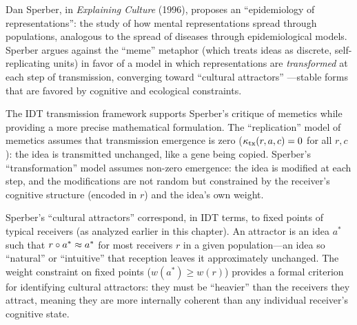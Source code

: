 \begin{interpretation}\label{interp:ch7:sperber_epidemiology}
Dan Sperber, in \emph{Explaining Culture} (1996), proposes an
``epidemiology of representations'': the study of how mental
representations spread through populations, analogous to the spread
of diseases through epidemiological models. Sperber argues against the
``meme'' metaphor (which treats ideas as discrete, self-replicating
units) in favor of a model in which representations are \emph{transformed}
at each step of transmission, converging toward ``cultural attractors''
---stable forms that are favored by cognitive and ecological constraints.

The IDT transmission framework supports Sperber's critique of memetics
while providing a more precise mathematical formulation. The
``replication'' model of memetics assumes that transmission emergence
is zero ($\kappa_{\text{tx}}(r, a, c) = 0$ for all $r, c$): the idea
is transmitted unchanged, like a gene being copied. Sperber's
``transformation'' model assumes non-zero emergence: the idea is
modified at each step, and the modifications are not random but
constrained by the receiver's cognitive structure (encoded in $r$)
and the idea's own weight.

Sperber's ``cultural attractors'' correspond, in IDT terms, to fixed
points of typical receivers (as analyzed earlier in this chapter). An
attractor is an idea $a^*$ such that $r \circ a^* \approx a^*$ for
most receivers $r$ in a given population---an idea so ``natural'' or
``intuitive'' that reception leaves it approximately unchanged. The
weight constraint on fixed points ($w(a^*) \geq w(r)$) provides a formal
criterion for identifying cultural attractors: they must be ``heavier''
than the receivers they attract, meaning they are more internally
coherent than any individual receiver's cognitive state.
\end{interpretation}


